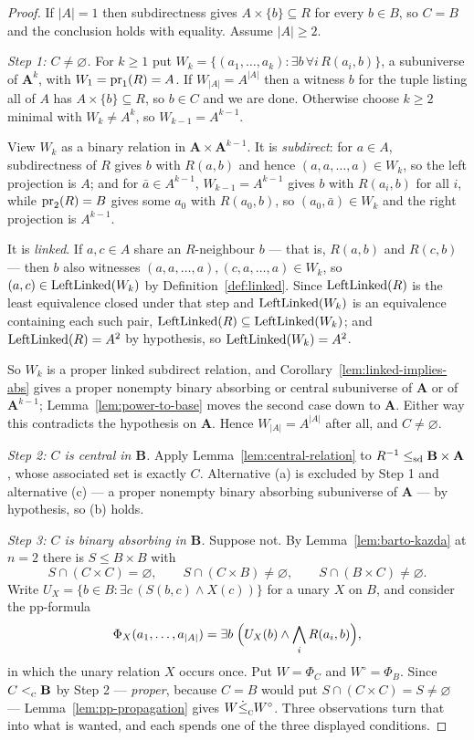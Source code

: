 \begin{proof}
If $|A|=1$ then subdirectness gives $A\times\{b\}\subseteq R$ for every
$b\in B$, so $C=B$ and the conclusion holds with equality. Assume $|A|\ge2$.

\emph{Step 1: $C\neq\varnothing$.} For $k\ge1$ put
$W_{k}=\{(a_{1},\dots,a_{k}):\exists b\,\forall i\,R(a_{i},b)\}$, a
subuniverse of $\mathbf A^{k}$, with $W_{1}=\operatorname*{pr}_{1}(R)=A$. If
$W_{|A|}=A^{|A|}$ then a witness $b$ for the tuple listing all of $A$ has
$A\times\{b\}\subseteq R$, so $b\in C$ and we are done. Otherwise choose
$k\ge2$ minimal with $W_{k}\neq A^{k}$, so $W_{k-1}=A^{k-1}$.

View $W_{k}$ as a binary relation in $\mathbf A\times\mathbf A^{k-1}$. It is
\emph{subdirect}: for $a\in A$, subdirectness of $R$ gives $b$ with $R(a,b)$
and hence $(a,a,\dots,a)\in W_{k}$, so the left projection is $A$; and for
$\bar a\in A^{k-1}$, $W_{k-1}=A^{k-1}$ gives $b$ with $R(a_{i},b)$ for all
$i$, while $\operatorname*{pr}_{2}(R)=B$ gives some $a_{0}$ with $R(a_{0},b)$, so
$(a_{0},\bar a)\in W_{k}$ and the right projection is $A^{k-1}$.

It is \emph{linked}. If $a,c\in A$ share an $R$-neighbour $b$ --- that is,
$R(a,b)$ and $R(c,b)$ --- then $b$ also witnesses
$(a,a,\dots,a),(c,a,\dots,a)\in W_{k}$, so $(a,c)\in\operatorname{LeftLinked}(W_{k})$ by
Definition~\ref{def:linked}. Since $\operatorname{LeftLinked}(R)$ is the least equivalence
closed under that step and $\operatorname{LeftLinked}(W_{k})$ is an equivalence containing
each such pair, $\operatorname{LeftLinked}(R)\subseteq\operatorname{LeftLinked}(W_{k})$; and
$\operatorname{LeftLinked}(R)=A^{2}$ by hypothesis, so $\operatorname{LeftLinked}(W_{k})=A^{2}$.

So $W_{k}$ is a proper linked subdirect relation, and
Corollary~\ref{lem:linked-implies-abs} gives a proper nonempty binary absorbing
or central subuniverse of $\mathbf A$ or of $\mathbf A^{k-1}$;
Lemma~\ref{lem:power-to-base} moves the second case down to $\mathbf A$. Either
way this contradicts the hypothesis on $\mathbf A$. Hence
$W_{|A|}=A^{|A|}$ after all, and $C\neq\varnothing$.

\emph{Step 2: $C$ is central in $\mathbf B$.} Apply
Lemma~\ref{lem:central-relation} to $R^{-1}\le_{\mathrm{sd}}\mathbf B\times\mathbf A$,
whose associated set is exactly $C$. Alternative (a) is excluded by Step 1 and
alternative (c) --- a proper nonempty binary absorbing subuniverse of
$\mathbf A$ --- by hypothesis, so (b) holds.

\emph{Step 3: $C$ is binary absorbing in $\mathbf B$.} Suppose not. By
Lemma~\ref{lem:barto-kazda} at $n=2$ there is $S\le B\times B$ with
\[
  S\cap(C\times C)=\varnothing,\qquad
  S\cap(C\times B)\neq\varnothing,\qquad
  S\cap(B\times C)\neq\varnothing .
\]
Write $U_{X}=\{b\in B:\exists c\,(S(b,c)\wedge X(c))\}$ for a unary $X$ on
$B$, and consider the pp-formula
\[
  \Phi_{X}(a_{1},\dots,a_{|A|})=\exists b\;\Bigl(U_{X}(b)\wedge
    \bigwedge_{i}R(a_{i},b)\Bigr),
\]
in which the unary relation $X$ occurs once. Put $W=\Phi_{C}$ and
$W^{\circ}=\Phi_{B}$. Since $C<_{\textup{\textsc{c}}}^{}\mathbf B$ by Step 2 ---
\emph{proper}, because $C=B$ would put $S\cap(C\times C)=S\neq\varnothing$ ---
Lemma~\ref{lem:pp-propagation} gives $W\dot\le_{\textup{\textsc{c}}}^{}W^{\circ}$. Three
observations turn that into what is wanted, and each spends one of the three
displayed conditions.


\end{proof}
